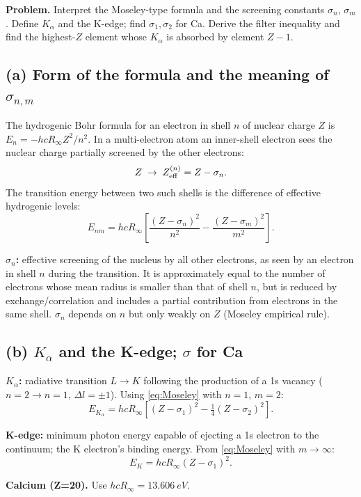 \documentclass[11pt]{article}
\begin{document}
\textbf{Problem.}
Interpret the Moseley-type formula and the screening constants $\sigma_n$, $\sigma_m$.
Define $K_{\alpha}$ and the K-edge; find $\sigma_{1},\sigma_{2}$ for Ca.
Derive the filter inequality and find the highest-$Z$ element whose $K_{\alpha}$ is absorbed by element $Z-1$.

\subsection*{(a) Form of the formula and the meaning of $\sigma_{n,m}$}

The hydrogenic Bohr formula for an electron in shell $n$ of nuclear charge $Z$ is $E_{n}=-hcR_{\infty}Z^{2}/n^{2}$. In a multi-electron atom an inner-shell electron sees the nuclear charge partially screened by the other electrons:
\[
Z\;\to\;Z_{\rm eff}^{(n)}=Z-\sigma_{n}.
\]
The transition energy between two such shells is the difference of effective hydrogenic levels:
\begin{equation}
E_{nm}=hcR_{\infty}\!\left[\frac{(Z-\sigma_{n})^{2}}{n^{2}}-\frac{(Z-\sigma_{m})^{2}}{m^{2}}\right].
\label{eq:Moseley}
\end{equation}

\textbf{$\sigma_{n}$:} effective screening of the nucleus by all other electrons, as seen by an electron in shell $n$ during the transition. It is approximately equal to the number of electrons whose mean radius is smaller than that of shell $n$, but is reduced by exchange/correlation and includes a partial contribution from electrons in the same shell. $\sigma_{n}$ depends on $n$ but only weakly on $Z$ (Moseley empirical rule).

\subsection*{(b) $K_{\alpha}$ and the K-edge; $\sigma$ for Ca}

\textbf{$K_{\alpha}$:} radiative transition $L\to K$ following the production of a 1s vacancy ($n=2\to n=1$, $\Delta l=\pm1$). Using \eqref{eq:Moseley} with $n=1$, $m=2$:
\[
E_{K_{\alpha}}=hcR_{\infty}\!\left[(Z-\sigma_{1})^{2}-\tfrac14(Z-\sigma_{2})^{2}\right].
\]

\textbf{K-edge:} minimum photon energy capable of ejecting a 1s electron to the continuum; the K electron's binding energy. From \eqref{eq:Moseley} with $m\to\infty$:
\[
E_{K}=hcR_{\infty}(Z-\sigma_{1})^{2}.
\]

\textbf{Calcium (Z=20).} Use $hcR_{\infty}=13.606\ \si{eV}$.
\end{document}
